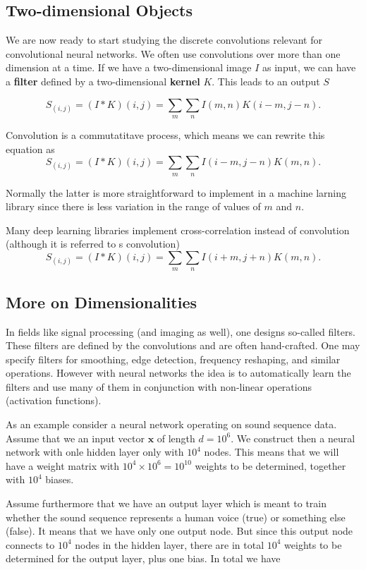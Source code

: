 \documentclass[%
oneside,                 %
final,                   %
10pt]{article}
\begin{document}
\subsection*{Two-dimensional Objects}

We are now ready to start studying the discrete convolutions relevant for convolutional neural networks.
We often use convolutions over more than one dimension at a time. If
we have a two-dimensional image $I$ as input, we can have a \textbf{filter}
defined by a two-dimensional \textbf{kernel} $K$. This leads to an output $S$

\[
S_(i,j)=(I * K)(i,j) = \sum_m\sum_n I(m,n)K(i-m,j-n).
\]

Convolution is a commutatitave process, which means we can rewrite this equation as
\[
S_(i,j)=(I * K)(i,j) = \sum_m\sum_n I(i-m,j-n)K(m,n).
\]

Normally the latter is more straightforward to implement in  a machine larning library since there is less variation in the range of values of $m$ and $n$.

Many deep learning libraries implement cross-correlation instead of convolution (although it is referred to s convolution)
\[
S_(i,j)=(I * K)(i,j) = \sum_m\sum_n I(i+m,j+n)K(m,n).
\]

\subsection*{More on Dimensionalities}

In fields like signal processing (and imaging as well), one designs
so-called filters. These filters are defined by the convolutions and
are often hand-crafted. One may specify filters for smoothing, edge
detection, frequency reshaping, and similar operations. However with
neural networks the idea is to automatically learn the filters and use
many of them in conjunction with non-linear operations (activation
functions).

As an example consider a neural network operating on sound sequence
data.  Assume that we an input vector $\bm{x}$ of length $d=10^6$.  We
construct then a neural network with onle hidden layer only with
$10^4$ nodes. This means that we will have a weight matrix with
$10^4\times 10^6=10^{10}$ weights to be determined, together with $10^4$ biases.

Assume furthermore that we have an output layer which is meant to train whether the sound sequence represents a human voice (true) or something else (false).
It means that we have only one output node. But since this output node connects to $10^4$ nodes in the hidden layer, there are in total $10^4$ weights to be determined for the output layer, plus one bias. In total we have
\end{document}
